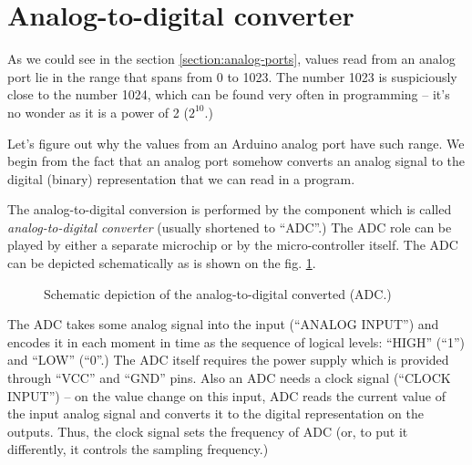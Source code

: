 \documentclass[../sparc.tex]{subfiles}
\begin{document}
\section{Analog-to-digital converter}

As we could see in the section \ref{section:analog-ports}, values read from an
analog port lie in the range that spans from 0 to 1023.  The number 1023 is
suspiciously close to the number 1024, which can be found very often in
programming -- it's no wonder as it is a power of 2 ($2^{10}$.)

Let's figure out why the values from an Arduino analog port have such range.  We
begin from the fact that an analog port somehow converts an analog signal to the
digital (binary) representation that we can read in a program.

The analog-to-digital conversion is performed by the component which is called
\emph{analog-to-digital converter} (usually shortened to ``ADC''.)  The ADC role
can be played by either a separate microchip or by the micro-controller itself.
The ADC can be depicted schematically as is shown on the
fig. \ref{fig:adc-schematics}.

\begin{figure}[ht]
  \centering
  \caption{Schematic depiction of the analog-to-digital converted (ADC.)}
  \label{fig:adc-schematics}
\end{figure}

The ADC takes some analog signal into the input (``ANALOG INPUT'') and encodes
it in each moment in time as the sequence of logical levels: ``HIGH'' (``1'')
and ``LOW'' (``0''.)  The ADC itself requires the power supply which is provided
through ``VCC'' and ``GND'' pins.  Also an ADC needs a clock signal (``CLOCK
INPUT'') -- on the value change on this input, ADC reads the current value of the
input analog signal and converts it to the digital representation on the
outputs.  Thus, the clock signal sets the frequency of ADC (or, to put it
differently, it controls the sampling frequency.)
\end{document}
